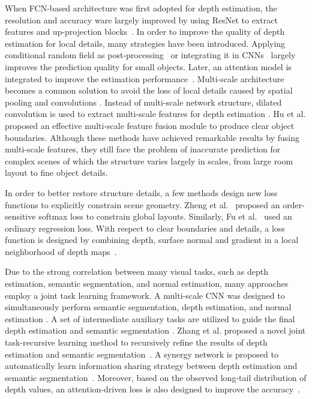 \documentclass{article}
\begin{document}
When FCN-based architecture was first adopted for depth estimation, the resolution and accuracy ware largely improved by using ResNet to extract features and up-projection blocks~\cite{laina2016deeper}.
In order to improve the quality of depth estimation for local details, many strategies have been introduced. 
Applying conditional random field as post-processing~\cite{li2015depth} or integrating it in CNNs~\cite{xu2017multi} largely improves the prediction quality for small objects.
Later, an attention model is integrated to improve the estimation performance~\cite{xu2018structured}. 
Multi-scale architecture becomes a common solution to avoid the loss of local details caused by spatial pooling and convolutions \cite{fu2018deep}.
Instead of multi-scale network structure, dilated 
convolution is used to extract multi-scale features for depth estimation \cite{hao2018detail}.
Hu et al.  proposed an effective multi-scale feature fusion module to produce clear object boundaries.
Although these methods have achieved remarkable results by fusing multi-scale features, they still face the problem of inaccurate prediction for complex scenes of which the structure varies largely in scales, from large room layout to fine object details.

In order to better restore structure details, a few methods design new loss functions to explicitly constrain scene geometry. 
Zheng et al.~ proposed an order-sensitive softmax loss to constrain global layouts. Similarly, Fu et al.~ used an ordinary regression loss. 
With respect to clear boundaries and details, a loss function is designed by combining depth, surface normal and gradient in a local neighborhood of depth maps~\cite{hu2019revisiting}. 

Due to the strong correlation between many visual tasks, such as depth estimation, semantic segmentation, and normal estimation, many approaches employ a joint task learning framework. A multi-scale CNN was designed to simultaneously perform semantic segmentation, depth estimation, and normal estimation \cite{eigen2015predicting}. 
A set of intermediate auxiliary tasks are utilized to guide the final depth estimation and semantic segmentation \cite{Xu_2018_CVPR}. 
Zhang et al. proposed a novel joint task-recursive learning method to recursively refine the results of depth estimation and semantic segmentation~\cite{Zhang_2018_ECCV}. 
A synergy network is proposed to automatically learn information sharing strategy between depth estimation and semantic segmentation~\cite{jiao2018look}.
Moreover, based on the observed long-tail distribution of depth values, an attention-driven loss is also designed to improve the accuracy~\cite{jiao2018look}.
\end{document}
